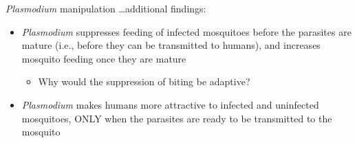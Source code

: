 \begin{frame}[t]
    \begin{adjustwidth}{-2em}{-1.5em}
        \textit{Plasmodium} manipulation \ldots additional findings:

        \begin{itemize}
            \item<2-> \textit{Plasmodium} suppresses feeding of infected
                mosquitoes before the parasites are mature (i.e., before they
                can be transmitted to humans), and increases mosquito feeding
                once they are mature

                \begin{itemize}
                    \item Why would the suppression of biting be adaptive?

                \end{itemize}

                \vspace{4mm}
            \item<3-> \textit{Plasmodium} makes humans more attractive to
                infected and uninfected mosquitoes, ONLY when the parasites are
                ready to be transmitted to the mosquito
        \end{itemize}
    \end{adjustwidth}
\end{frame}


